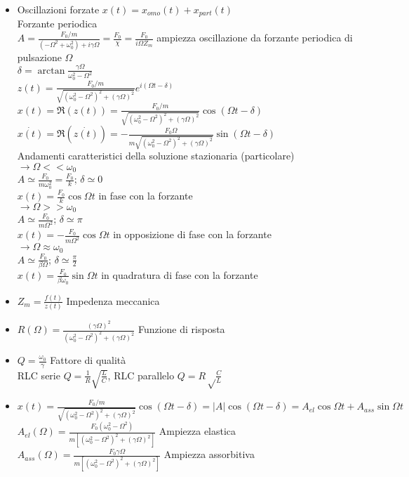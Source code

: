\documentclass[a4paper]{article}
\begin{document}
\begin{itemize}
		\item Oscillazioni forzate  $x(t)=x_{omo}(t)+x_{part}(t)$\\
		Forzante periodica\\
		$A=\frac{F_0/m}{(-\Omega^2+\omega_0^2)+i\gamma \Omega}=\frac{F_0}{\chi}=\frac{F_0}{i \Omega Z_m}$ ampiezza oscillazione da forzante periodica di pulsazione $\Omega$\\
		$\delta = \arctan\frac{\gamma \Omega}{\omega^2_0-\Omega^2}$\\
		$z(t)=\frac{F_0/m}{\sqrt{(\omega_0^2-\Omega^2)^2+(\gamma \Omega)^2}}e^{i(\Omega t-\delta)}$\\
		$x(t)=\Re(z(t))=\frac{F_0/m}{\sqrt{(\omega_0^2-\Omega^2)^2+(\gamma \Omega)^2}} \cos(\Omega t-\delta)$\\
		$\dot{x(t)}=\Re(\dot{z(t)})=-\frac{F_0 \Omega}{m\sqrt{(\omega_0^2-\Omega^2)^2+(\gamma \Omega)^2}} \sin(\Omega t-\delta)$\\
		Andamenti caratteristici della soluzione stazionaria (particolare)\\
		$\rightarrow \Omega << \omega_0$\\
		$A\simeq \frac{F_0}{m \omega_0^2}= \frac{F_0}{k}$; $\delta \simeq0$\\
		$x(t)=\frac{F_0}{k}\cos\Omega t$ in fase con la forzante\\
		$\rightarrow \Omega >> \omega_0$\\
		$A\simeq \frac{F_0}{m \Omega^2}$; $\delta \simeq \pi$\\
		$x(t)=-\frac{F_0}{m \Omega^2}\cos\Omega t$ in opposizione di fase con la forzante\\
		$\rightarrow \Omega \approx \omega_0$\\
		$A\simeq \frac{F_0}{\beta \Omega}$; $\delta \simeq \frac{\pi}{2}$\\
		$x(t)=\frac{F_0}{\beta \omega_0}\sin\Omega t$ in quadratura di fase con la forzante\\ %
		\item $Z_m=\frac{f(t)}{\dot{z}(t)}$ Impedenza meccanica
		\item $R(\Omega)=\frac{(\gamma \Omega)^2}{(\omega^2_0-\Omega^2)^2+(\gamma \Omega)^2}$ Funzione di risposta
		\item $Q=\frac{\omega_0}{\gamma}$ Fattore di qualità\\
		RLC serie $Q = \frac{1}{R} \sqrt{\frac{L}{C}}$,\hspace{5mm} RLC parallelo $Q = R \sqrt\frac{C}{L}$
		\item $x(t)= \frac{F_0/m}{\sqrt{(\omega_0^2 -\Omega^2)^2 + (\gamma \Omega)^2}} \cos(\Omega t-\delta) = |A| \cos(\Omega t -\delta)=A_{el} \cos \Omega t + A_{ass} \sin\Omega t$\\
		$A_{el}(\Omega)=\frac{F_0 (\omega_0^2-\Omega^2)}{m[(\omega_0^2-\Omega^2)^2+(\gamma \Omega)^2]}$ Ampiezza elastica\\
		$A_{ass}(\Omega)=\frac{F_0 \gamma \Omega}{m[(\omega_0^2-\Omega^2)^2+(\gamma \Omega)^2]}$ Ampiezza assorbitiva\\
		
	\end{itemize}
\end{document}
